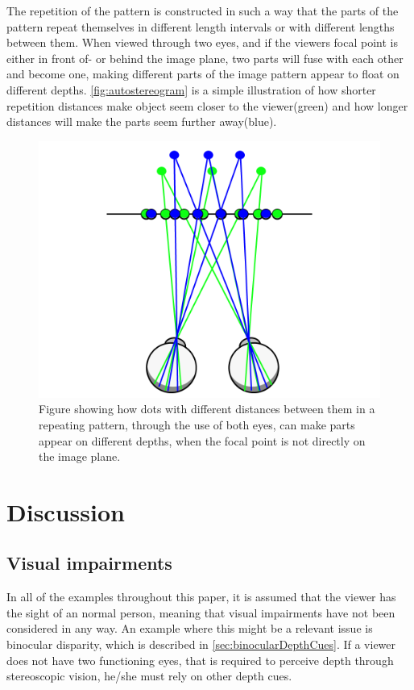 The repetition of the pattern is constructed in such a way that the parts of the pattern repeat themselves in different length intervals or with different lengths between them. When viewed through two eyes, and if the viewers focal point is either in front of- or behind the image plane, two parts will fuse with each other and become one, making different parts of the image pattern appear to float on different depths\citep{autostereogramNguyen}. \autoref{fig:autostereogram} is a simple illustration of how shorter repetition distances make object seem closer to the viewer(green) and how longer distances will make the parts seem further away(blue). 

\begin{figure}[H]
	\centering
	\includegraphics[width=0.8\linewidth]{figure/Analysis/autoStereogram.png}
	\caption{Figure showing how dots with different distances between them in a repeating pattern, through the use of both eyes, can make parts appear on different depths, when the focal point is not directly on the image plane.}
	\label{fig:autostereogram}
\end{figure}

\section{Discussion}
	\subsection{Visual impairments}
	In all of the examples throughout this paper, it is assumed that the viewer has the sight of an normal person, meaning that visual impairments have not been considered in any way. An example where this might be a relevant issue is binocular disparity, which is described in \autoref{sec:binocularDepthCues}. If a viewer does not have two functioning eyes, that is required to perceive depth through stereoscopic vision, he/she must rely on other depth cues.

